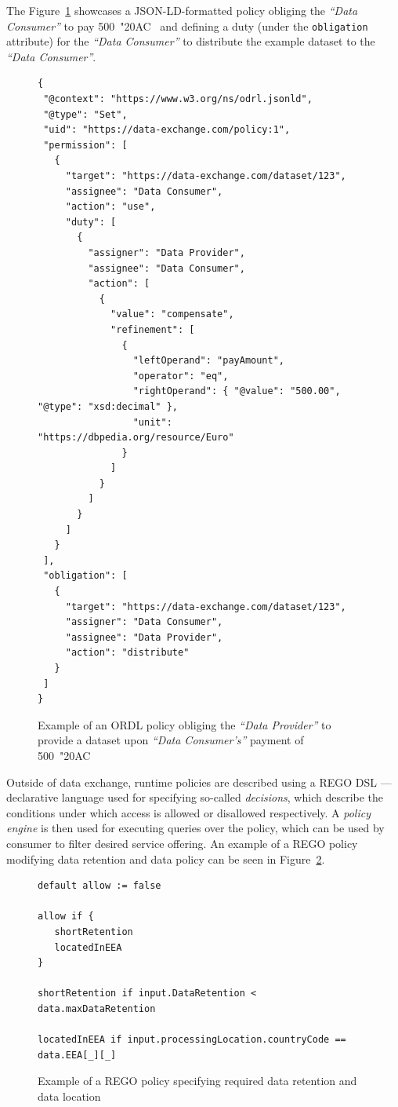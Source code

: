 The Figure~\ref{fig:ordl_example} showcases a JSON-LD-formatted policy obliging the \textit{``Data Consumer''} to pay 500~\char"20AC~ and defining a duty (under the \texttt{obligation} attribute) for the \textit{``Data Consumer''} to distribute the example dataset to the \textit{``Data Consumer''}.

\begin{figure}
    \centering
    \begin{verbatim}
{
 "@context": "https://www.w3.org/ns/odrl.jsonld",
 "@type": "Set",
 "uid": "https://data-exchange.com/policy:1",
 "permission": [
   {
     "target": "https://data-exchange.com/dataset/123",
     "assignee": "Data Consumer",
     "action": "use",
     "duty": [
       {
         "assigner": "Data Provider",
         "assignee": "Data Consumer",
         "action": [
           {
             "value": "compensate",
             "refinement": [
               {
                 "leftOperand": "payAmount",
                 "operator": "eq",
                 "rightOperand": { "@value": "500.00", "@type": "xsd:decimal" },
                 "unit": "https://dbpedia.org/resource/Euro"
               }
             ]
           }
         ]
       }
     ]
   }
 ],
 "obligation": [
   {
     "target": "https://data-exchange.com/dataset/123",
     "assigner": "Data Consumer",
     "assignee": "Data Provider",
     "action": "distribute"
   }
 ]
}
    \end{verbatim}
    \caption{Example of an ORDL policy obliging the \textit{``Data Provider''} to provide a dataset upon \textit{``Data Consumer's''} payment of 500~\char"20AC~~\cite{gaiax_data_exchange_document}}\label{fig:ordl_example}
\end{figure}


Outside of data exchange, runtime policies are described using a REGO DSL --- declarative language used for specifying so-called \textit{decisions}, which describe the conditions under which access is allowed or disallowed respectively.
A \textit{policy engine} is then used for executing queries over the policy, which can be used by consumer to filter desired service offering.
An example of a REGO policy modifying data retention and data policy can be seen in Figure~\ref{fig:rego_policy_example}.

\begin{figure}
    \centering
    \begin{verbatim}
default allow := false

allow if {
   shortRetention
   locatedInEEA
}

shortRetention if input.DataRetention < data.maxDataRetention

locatedInEEA if input.processingLocation.countryCode == data.EEA[_][_]
    \end{verbatim}
    \caption{Example of a REGO policy specifying required data retention and data location~\cite{gaiax_compliance_as_a_code}}\label{fig:rego_policy_example}
\end{figure}

